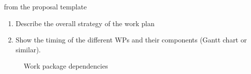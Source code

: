 \begin{todo}{from the proposal template}
\begin{enumerate}
\item Describe the overall strategy of the work plan
\item Show the timing of the different WPs and their components (Gantt chart or similar).
\end{enumerate}
\end{todo}
\begin{figure}
  \caption{Work package dependencies}
  \label{fig:wp-deps}
\end{figure}

\ganttchart[draft,xscale=.45] 


